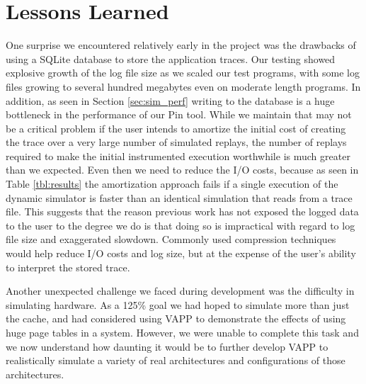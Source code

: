 \section{Lessons Learned}
One surprise we encountered relatively early in the project
was the drawbacks of using a SQLite database to store the
application traces.  Our testing showed explosive growth
of the log file size as we scaled our test programs,
with some log files growing to several hundred megabytes
even on moderate length programs.  In addition, as
seen in Section \ref{sec:sim_perf} writing to the database is a
huge bottleneck in the performance of our Pin tool.
While we maintain that may not be a critical problem if the
user intends to amortize the initial cost of creating the
trace over a very large number of simulated replays,
the number of replays required to make the initial instrumented
execution worthwhile is much greater than we expected.  Even then
we need to reduce the I/O costs, because as seen in Table
\ref{tbl:results} the amortization approach fails if
a single execution of the dynamic simulator is faster than
an identical simulation that reads from a trace file.
This suggests
that the reason previous work has not exposed the logged data to
the user to the degree we do is that doing so is impractical
with regard to log file size and exaggerated slowdown.  Commonly
used compression techniques would help reduce I/O costs and log
size, but at the expense of the user's ability to interpret
the stored trace.

Another unexpected challenge we faced during development was
the difficulty in simulating hardware.  As a 125\% goal we
had hoped to simulate more than just the cache, and had considered
using VAPP to demonstrate the effects of using huge page tables
in a system.  However, we were unable to complete this task and
we now understand how daunting it would be to further develop
VAPP to realistically simulate a variety of real architectures and
configurations of those architectures.
